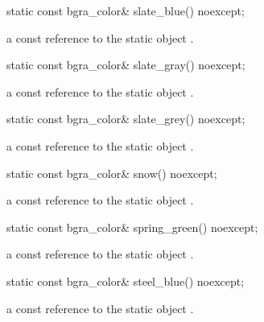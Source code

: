 \begin{itemdecl}
static const bgra_color& slate_blue() noexcept;
\end{itemdecl}
\begin{itemdescr}
\pnum
\returns
a const reference to the static  object .
\end{itemdescr}

\begin{itemdecl}
static const bgra_color& slate_gray() noexcept;
\end{itemdecl}
\begin{itemdescr}
\pnum
\returns
a const reference to the static  object .
\end{itemdescr}

\begin{itemdecl}
static const bgra_color& slate_grey() noexcept;
\end{itemdecl}
\begin{itemdescr}
\pnum
\returns
a const reference to the static  object .
\end{itemdescr}

\begin{itemdecl}
static const bgra_color& snow() noexcept;
\end{itemdecl}
\begin{itemdescr}
\pnum
\returns
a const reference to the static  object .
\end{itemdescr}

\begin{itemdecl}
static const bgra_color& spring_green() noexcept;
\end{itemdecl}
\begin{itemdescr}
\pnum
\returns
a const reference to the static  object .
\end{itemdescr}

\begin{itemdecl}
static const bgra_color& steel_blue() noexcept;
\end{itemdecl}
\begin{itemdescr}
\pnum
\returns
a const reference to the static  object .
\end{itemdescr}

